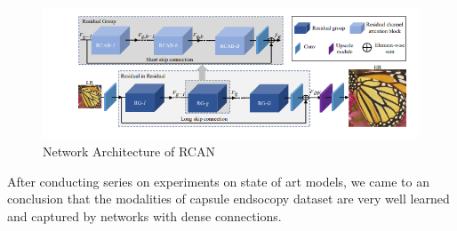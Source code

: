 \begin{figure}[H]
    \centering
    \includegraphics[totalheight=2.0in]{Chapter5/image23.png}
    \caption{Network Architecture of RCAN}
    \label{fig:test14}
\end{figure}

After conducting series on experiments on state of art models, we came to an conclusion that the modalities of capsule endsocopy dataset are very well learned and captured by networks with dense connections.
